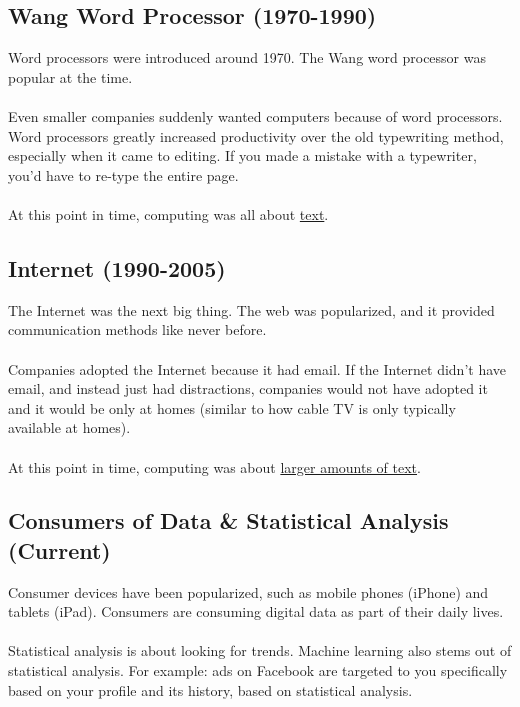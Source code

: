 \documentclass[]{article}
\theoremstyle{definition}
\begin{document}
		\subsection{Wang Word Processor (1970-1990)}
			Word processors were introduced around 1970. The Wang word processor was popular at the time.
			\\ \\
			Even smaller companies suddenly wanted computers because of word processors. Word processors greatly increased productivity over the old typewriting method, especially when it came to editing. If you made a mistake with a typewriter, you'd have to re-type the entire page.
			\\ \\
			At this point in time, computing was all about \underline{text}.

		\subsection{Internet (1990-2005)}
			The Internet was the next big thing. The web was popularized, and it provided communication methods like never before.
			\\ \\
			Companies adopted the Internet because it had email. If the Internet didn't have email, and instead just had distractions, companies would not have adopted it and it would be only at homes (similar to how cable TV is only typically available at homes).
			\\ \\
			At this point in time, computing was about \underline{larger amounts of text}.

		\subsection{Consumers of Data \& Statistical Analysis (Current)}
			Consumer devices have been popularized, such as mobile phones (iPhone) and tablets (iPad). Consumers are consuming digital data as part of their daily lives.
			\\ \\
			Statistical analysis is about looking for trends. Machine learning also stems out of statistical analysis. For example: ads on Facebook are targeted to you specifically based on your profile and its history, based on statistical analysis.
\end{document}
